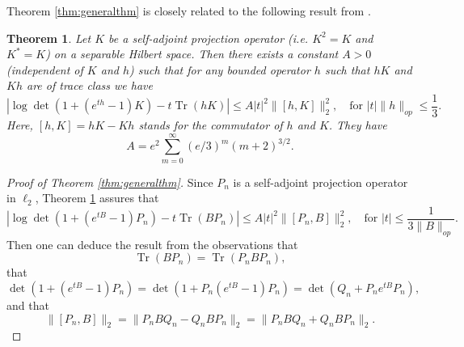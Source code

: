 \documentclass[11pt]{amsart}
\theoremstyle{plain}
\newtheorem{theorem}{Theorem}[section]
\theoremstyle{remark}
\DeclareMathOperator{\Tr}{Tr}
\numberwithin{equation}{section}
\begin{document}
Theorem \ref{thm:generalthm} is closely related to the following result from \cite{BreuerDuits}.

\begin{theorem}\label{thm:Breuer-Duits}
Let $K$ be a self-adjoint projection operator (i.e. $K^2=K$ and $K^*=K$) on a separable Hilbert space. Then there exists a constant $A>0$ (independent of $K$ and $h$) such that for any bounded operator $h$ such that $hK$ and $Kh$ are of trace class we have 
\begin{equation}
\left|\log \det(1+(e^{th}-1)K)-t \Tr (hK)\right| \leq A|t|^2\|[h,K]\|_2^2, \quad\text{for $|t| \|h\|_{op}\leq\frac{1}{3}$.}
\end{equation}
Here, $[h,K]=hK-Kh$ stands for the commutator of $h$ and $K$. They have
$$A=e^2\sum_{m=0}^{\infty} (e/3)^m (m+2)^{3/2}.$$

\end{theorem} 


\begin{proof}[Proof of Theorem \ref{thm:generalthm}]
Since $P_n$ is a self-adjoint projection operator in $\ell_2$, Theorem \ref{thm:Breuer-Duits} assures that 
$$\left|\log \det(1+(e^{tB}-1)P_n)-t \Tr (BP_n)\right| \leq A|t|^2\|[P_n,B]\|_2^2, \quad\text{for $|t|\leq\frac{1}{3\|B\|_{op}}$.}
$$
Then one can deduce the result from the observations that 
$$\Tr (BP_n)=\Tr (P_nBP_n),$$
that
\begin{equation}\label{eqn:determinantdeduction}
\det(1+(e^{tB}-1)P_n)=\det(1+P_n(e^{tB}-1)P_n)=\det(Q_n+P_ne^{tB}P_n),
\end{equation}
and that 
$$\|[P_n,B]\|_2=\|P_nBQ_n-Q_nBP_n\|_2= \|P_nBQ_n+Q_nBP_n\|_2.$$
\end{proof}
\end{document}
